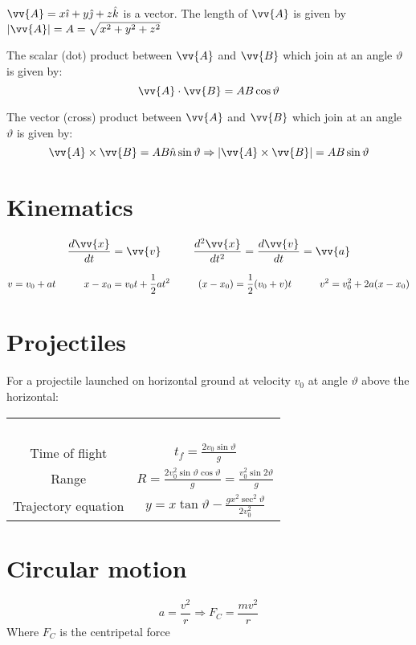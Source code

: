 \documentclass{article}
\begin{document}
\(\vv{A}=x\hat{\imath}+y\hat{\jmath}+z\hat{k}\) is a vector. The length of \(\vv{A}\) is given by \(|\vv{A}|=A=\sqrt{x^2+y^2+z^2}\)

The scalar (dot) product between \(\vv{A}\) and \(\vv{B}\) which join at an angle \(\vartheta\) is given by:
\[\vv{A}\cdot\vv{B}=AB\cos\vartheta\]

The vector (cross) product between \(\vv{A}\) and \(\vv{B}\) which join at an angle \(\vartheta\) is given by:
\[\vv{A}\times\vv{B}=AB\hat{n}\sin\vartheta\Rightarrow|\vv{A}\times\vv{B}|=AB\sin\vartheta\]

\section*{Kinematics}

\[\frac{d\vv{x}}{dt}=\vv{v} \hspace{1 cm} \frac{d^2\vv{x}}{dt^2}=\frac{d\vv{v}}{dt}=\vv{a}\]

\[v=v_0+at \hspace{1 cm} x-x_0=v_0t+\frac{1}{2}at^2 \hspace{1 cm} (x-x_0)=\frac{1}{2}(v_0+v)t \hspace{1 cm} v^2=v_0^2+2a(x-x_0)\]

\section*{Projectiles}

For a projectile launched on horizontal ground at velocity \(v_0\) at angle \(\vartheta\) above the horizontal:

\begin{center}
\begin{tabular}{c c}
~&~\\[0.05 cm]
Time of flight & \(t_f=\frac{2v_0\sin\vartheta}{g}\)\\ [0.25 cm]
Range & \(R=\frac{2v_0^2\sin\vartheta\cos\vartheta}{g}=\frac{v_0^2\sin2\vartheta}{g}\)\\[0.25 cm]
Trajectory equation & \(y=x\tan\vartheta-\frac{gx^2\sec^2\vartheta}{2v_0^2}\)
\end{tabular}
\end{center}

\section*{Circular motion}

\[a=\frac{v^2}{r}\Rightarrow F_C=\frac{mv^2}{r}\]
Where \(F_C\) is the centripetal force
\end{document}
